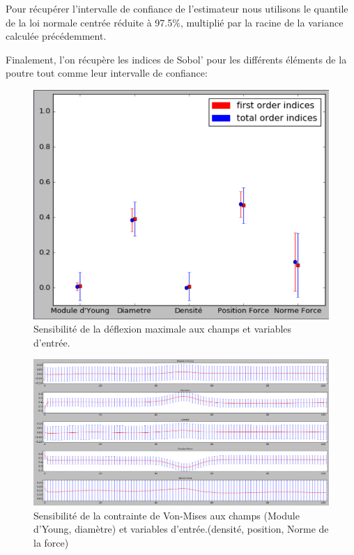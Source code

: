 \documentclass[a4paper,10pt]{article}
\begin{document}
Pour récupérer l'intervalle de confiance de l'estimateur nous utilisons le quantile de la loi normale centrée réduite à 97.5\%, multiplié par la racine de la variance calculée précédemment. 

Finalement, l'on récupère les indices de Sobol' pour les différents éléments de la poutre tout comme leur intervalle de confiance: 



\begin{figure}[H]
   \centering   
   \includegraphics[scale=0.195]{sensibiliteDeflection10K.png}
      \caption{Sensibilité de la déflexion maximale aux champs et variables d'entrée.}
         \label{MaxDeflec}
\end{figure}

\begin{figure}[H]
   \centering   
   \includegraphics[scale=0.255]{sensibiliteVonMises10K.png}
      \caption{Sensibilité de la contrainte de Von-Mises aux champs (Module d'Young, diamètre) et variables d'entrée.(densité, position, Norme de la force)}
         \label{VonMises}
\end{figure}
\end{document}
